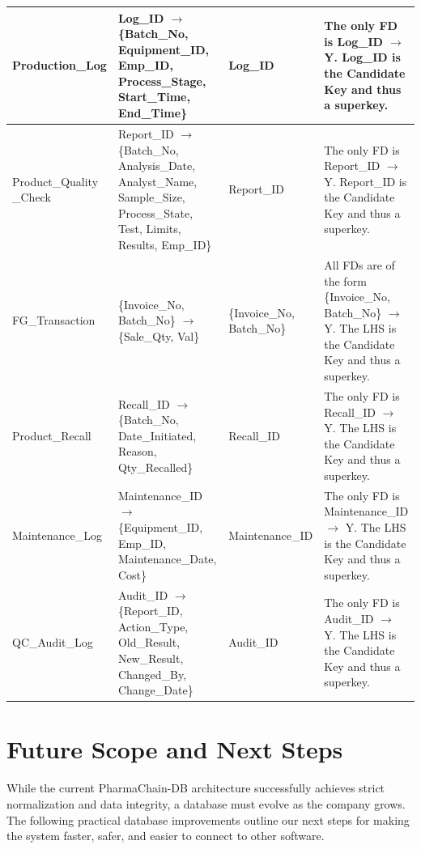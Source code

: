 \documentclass[12pt, a4paper]{article}
\begin{document}
\begin{longtable}{|p{}|p{}|p{}|p{}|}
Production\_Log & 
Log\_ID $\rightarrow$ \{Batch\_No, Equipment\_ID, Emp\_ID, Process\_Stage, Start\_Time, End\_Time\} & 
Log\_ID & 
The only FD is Log\_ID $\rightarrow$ Y. Log\_ID is the Candidate Key and thus a superkey. \\ \hline

Product\_Quality \newline \_Check & 
Report\_ID $\rightarrow$ \{Batch\_No, Analysis\_Date, Analyst\_Name, Sample\_Size, Process\_State, Test, Limits, Results, Emp\_ID\} & 
Report\_ID & 
The only FD is Report\_ID $\rightarrow$ Y. Report\_ID is the Candidate Key and thus a superkey. \\ \hline

FG\_Transaction & 
\{Invoice\_No, Batch\_No\} $\rightarrow$ \{Sale\_Qty, Val\} & 
\{Invoice\_No, Batch\_No\} & 
All FDs are of the form \{Invoice\_No, Batch\_No\} $\rightarrow$ Y. The LHS is the Candidate Key and thus a superkey. \\ \hline

Product\_Recall & 
Recall\_ID $\rightarrow$ \{Batch\_No, Date\_Initiated, Reason, Qty\_Recalled\} & 
Recall\_ID & 
The only FD is Recall\_ID $\rightarrow$ Y. The LHS is the Candidate Key and thus a superkey. \\ \hline

Maintenance\_Log & 
Maintenance\_ID $\rightarrow$ \{Equipment\_ID, Emp\_ID, Maintenance\_Date, Cost\} & 
Maintenance\_ID & 
The only FD is Maintenance\_ID $\rightarrow$ Y. The LHS is the Candidate Key and thus a superkey. \\ \hline

QC\_Audit\_Log & 
Audit\_ID $\rightarrow$ \{Report\_ID, Action\_Type, Old\_Result, New\_Result, Changed\_By, Change\_Date\} & 
Audit\_ID & 
The only FD is Audit\_ID $\rightarrow$ Y. The LHS is the Candidate Key and thus a superkey. \\ \hline

\end{longtable}

\clearpage
\section{Future Scope and Next Steps}
While the current PharmaChain-DB architecture successfully achieves strict normalization and data integrity, a database must evolve as the company grows. The following practical database improvements outline our next steps for making the system faster, safer, and easier to connect to other software.
\end{document}
